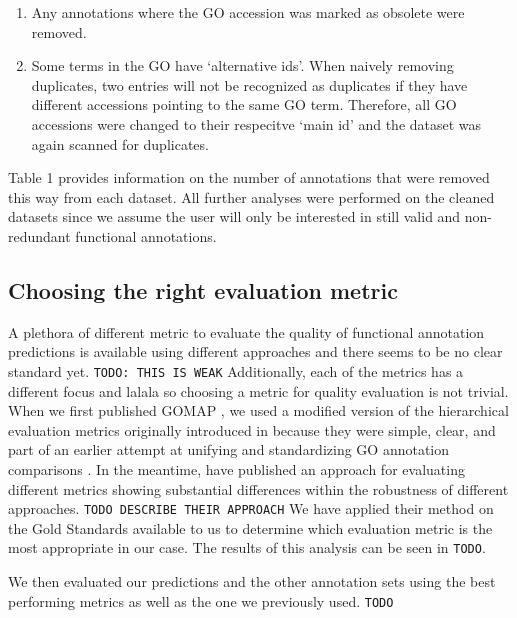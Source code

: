 \documentclass[utf8]{frontiersSCNS}
\providecommand{\tightlist}{%
  \setlength{\itemsep}{0pt}\setlength{\parskip}{0pt}}
\begin{document}
\begin{enumerate}
\def\labelenumi{\arabic{enumi}.}
\tightlist
\item
  Any annotations where the GO accession was marked as obsolete were removed.
\item
  Some terms in the GO have `alternative ids'. When naively removing duplicates, two entries will not be recognized as duplicates if they have different accessions pointing to the same GO term. Therefore, all GO accessions were changed to their respecitve `main id' and the dataset was again scanned for duplicates.
\end{enumerate}

Table 1 provides information on the number of annotations that were removed this way from each dataset.
All further analyses were performed on the cleaned datasets since we assume the user will only be interested in still valid and non-redundant functional annotations.

\hypertarget{choosing-the-right-evaluation-metric}{%
\subsection{Choosing the right evaluation metric}\label{choosing-the-right-evaluation-metric}}

A plethora of different metric to evaluate the quality of functional annotation predictions is available using different approaches and there seems to be no clear standard yet. \texttt{TODO:\ THIS\ IS\ WEAK}
Additionally, each of the metrics has a different focus and lalala so choosing a metric for quality evaluation is not trivial.
When we first published GOMAP \citep{Wimalanathan2018}, we used a modified version of the hierarchical evaluation metrics originally introduced in \citep{Verspoor2006} because they were simple, clear, and part of an earlier attempt at unifying and standardizing GO annotation comparisons \citep{Defoin-Platel2011}.
In the meantime, \citet{Plyusnin2018} have published an approach for evaluating different metrics showing substantial differences within the robustness of different approaches.
\texttt{TODO\ DESCRIBE\ THEIR\ APPROACH}
We have applied their method on the Gold Standards available to us to determine which evaluation metric is the most appropriate in our case.
The results of this analysis can be seen in \texttt{TODO}.

We then evaluated our predictions and the other annotation sets using the best performing metrics as well as the one we previously used.
\texttt{TODO}
\end{document}
